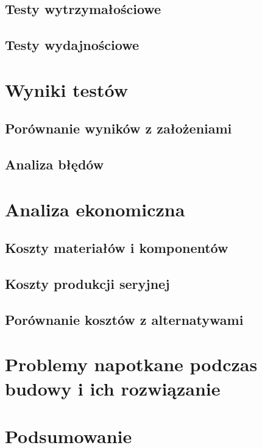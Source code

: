     \section{Testy wytrzymałościowe}
      \noindent\lipsum[4-7]

    \section{Testy wydajnościowe}
      \noindent\lipsum[8-10]

\clearpage\chapter{Wyniki testów}
  \noindent\lipsum[1-7]

    \section{Porównanie wyników z założeniami}
      \noindent\lipsum[1-3]

    \section{Analiza błędów}
      \noindent\lipsum[4-6]

\clearpage\chapter{Analiza ekonomiczna}  
  \noindent\lipsum[1-7]

  \section{Koszty materiałów i komponentów}
    \noindent\lipsum[1-3]

  \section{Koszty produkcji seryjnej}
    \noindent\lipsum[4-7]

  \section{Porównanie kosztów z alternatywami}
    \noindent\lipsum[8-10]

\clearpage\chapter{Problemy napotkane podczas budowy i ich rozwiązanie}
\noindent \lipsum[1-5]

\clearpage\chapter*{Podsumowanie}
    \noindent \lipsum[1-9]